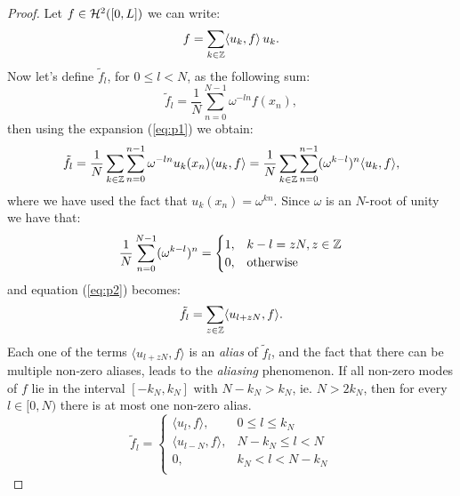 \begin{proof}
    Let $f\in\mathcal{H}^2([0,L])$ we can write:
    \begin{equation}
        f = \sum_{k\in\mathbb{Z}} \langle u_k,f\rangle\, u_k.
        \label{eq:p1}
    \end{equation}
    Now let's define $\tilde f_l$, for $0\le l < N$, as the following sum:
    \begin{equation}
        \tilde f_l
        = \frac{1}{N} \sum_{n=0}^{N-1} \omega^{-ln} f(x_n),
    \end{equation}
    then using the expansion (\ref{eq:p1}) we obtain:
    \begin{equation}
        \tilde f_l
        = \frac{1}{N} \sum_{k\in\mathbb{Z}}\sum_{n=0}^{n-1} 
            \omega^{-ln} u_{k}(x_n) \langle u_k, f\rangle
        = \frac{1}{N} \sum_{k\in\mathbb{Z}} \sum_{n=0}^{n-1} 
            (\omega^{k-l})^n \langle u_k, f\rangle,
       \label{eq:p2}
    \end{equation}
    where we have used the fact that $u_k(x_n) = \omega^{kn}$.
    Since $\omega$ is an $N$-root of unity we have that:
    \begin{equation}
        \frac{1}{N} \sum_{n=0}^{N-1} 
            (\omega^{k-l})^n  = 
            \begin{cases}
                1, & k-l = zN, z\in\mathbb{Z}\\
                0, & \text{otherwise}
            \end{cases}
    \end{equation}
    and equation (\ref{eq:p2}) becomes:
    \begin{equation}
        \tilde f_l
        = \sum_{z\in\mathbb{Z}} 
           \langle u_{l + zN}, f\rangle.
        \label{eq:p3}
    \end{equation}
    Each one of the terms $\langle u_{l+zN},f\rangle$ is an \emph{alias}
    of $\tilde f_l$, and the fact that there can be
    multiple non-zero aliases, leads to the \emph{aliasing} phenomenon.
    If all non-zero modes of $f$ lie in the interval $[-k_N,k_N]$
    with $N-k_N > k_N$, ie. $N > 2k_N$, then for every $l\in [0,N)$
    there is at most one non-zero alias.
    \begin{equation}
        \tilde f_l
        = 
        \begin{cases}
            \langle u_l, f \rangle, & 0\le l \le k_N \\
            \langle u_{l-N}, f \rangle, & N - k_N\le l < N \\
            0, & k_N <  l < N-k_N \\

\end{cases}
\end{equation}
\end{proof}
